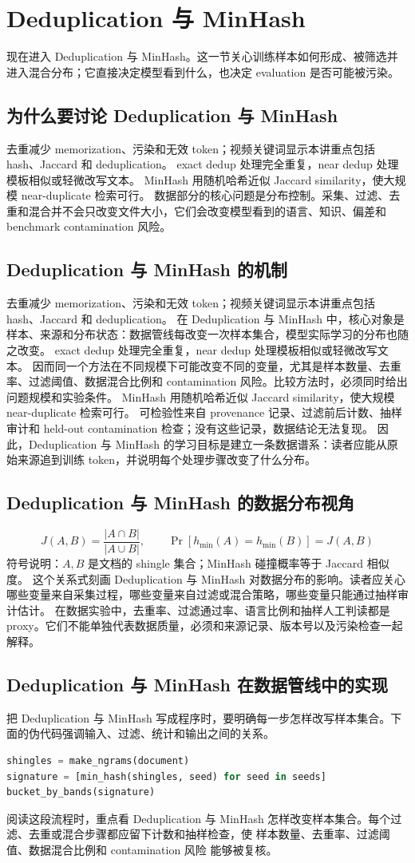\documentclass[a4paper]{article}
\begin{document}
\section{Deduplication 与 MinHash}
现在进入 Deduplication 与 MinHash。这一节关心训练样本如何形成、被筛选并进入混合分布；它直接决定模型看到什么，也决定 evaluation 是否可能被污染。
\subsection{为什么要讨论 Deduplication 与 MinHash}
去重减少 memorization、污染和无效 token；视频关键词显示本讲重点包括 hash、Jaccard 和 deduplication。
exact dedup 处理完全重复，near dedup 处理模板相似或轻微改写文本。
MinHash 用随机哈希近似 Jaccard similarity，使大规模 near-duplicate 检索可行。
数据部分的核心问题是分布控制。采集、过滤、去重和混合并不会只改变文件大小，它们会改变模型看到的语言、知识、偏差和 benchmark contamination 风险。
\subsection{Deduplication 与 MinHash 的机制}
去重减少 memorization、污染和无效 token；视频关键词显示本讲重点包括 hash、Jaccard 和 deduplication。 在 Deduplication 与 MinHash 中，核心对象是样本、来源和分布状态：数据管线每改变一次样本集合，模型实际学习的分布也随之改变。
exact dedup 处理完全重复，near dedup 处理模板相似或轻微改写文本。 因而同一个方法在不同规模下可能改变不同的变量，尤其是样本数量、去重率、过滤阈值、数据混合比例和 contamination 风险。比较方法时，必须同时给出问题规模和实验条件。
MinHash 用随机哈希近似 Jaccard similarity，使大规模 near-duplicate 检索可行。 可检验性来自 provenance 记录、过滤前后计数、抽样审计和 held-out contamination 检查；没有这些记录，数据结论无法复现。
因此，Deduplication 与 MinHash 的学习目标是建立一条数据谱系：读者应能从原始来源追到训练 token，并说明每个处理步骤改变了什么分布。
\subsection{Deduplication 与 MinHash 的数据分布视角}
\[J(A,B)=\frac{|A\cap B|}{|A\cup B|},\qquad \Pr[h_{\min}(A)=h_{\min}(B)]=J(A,B)\]
符号说明：\(A,B\) 是文档的 shingle 集合；MinHash 碰撞概率等于 Jaccard 相似度。
这个关系式刻画 Deduplication 与 MinHash 对数据分布的影响。读者应关心哪些变量来自采集过程，哪些变量来自过滤或混合策略，哪些变量只能通过抽样审计估计。
在数据实验中，去重率、过滤通过率、语言比例和抽样人工判读都是 proxy。它们不能单独代表数据质量，必须和来源记录、版本号以及污染检查一起解释。
\subsection{Deduplication 与 MinHash 在数据管线中的实现}
把 Deduplication 与 MinHash 写成程序时，要明确每一步怎样改写样本集合。下面的伪代码强调输入、过滤、统计和输出之间的关系。
\begin{lstlisting}[language=Python]
shingles = make_ngrams(document)
signature = [min_hash(shingles, seed) for seed in seeds]
bucket_by_bands(signature)
\end{lstlisting}
阅读这段流程时，重点看 Deduplication 与 MinHash 怎样改变样本集合。每个过滤、去重或混合步骤都应留下计数和抽样检查，使 样本数量、去重率、过滤阈值、数据混合比例和 contamination 风险 能够被复核。
\end{document}
